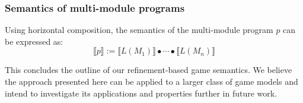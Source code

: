 \documentclass[format=sigplan,authordraft]{acmart}
\begin{document}
\subsubsection{Semantics of multi-module programs}

Using horizontal composition,
the semantics of the multi-module program $p$
can be expressed as:
\[
    \llbracket p \rrbracket :=
    \llbracket L(M_1) \rrbracket \bullet \cdots \bullet
    \llbracket L(M_n) \rrbracket
\]

This concludes the outline of our refinement-based game semantics.
We believe the approach presented here can be applied to a larger class
of game models and intend to investigate its applications
and properties further in future work.

\end{document}
